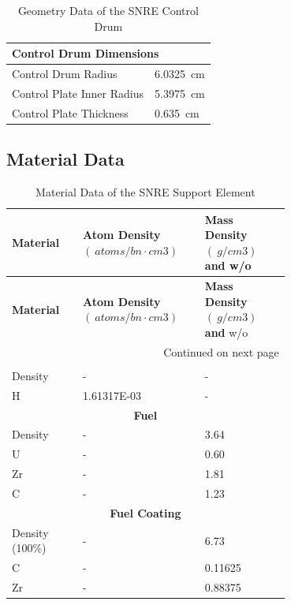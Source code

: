 \documentclass[8pt,a5paper]{article}
\begin{document}
\begin{table}[h!]
    \label{table: Table 5}
    \centering
    \small
    \caption{Geometry Data of the SNRE Control Drum}
    \begin{tabular}{|l|l|}
    \hline
    \multicolumn{2}{|l|}{\textbf{Control Drum Dimensions}}\\\hline
    Control Drum Radius & \SI{6.0325}{cm}\\
    Control Plate Inner Radius & \SI{5.3975}{cm}\\
    Control Plate Thickness & \SI{0.635}{cm}\\\hline
    \end{tabular}
\end{table}

\subsection*{Material Data}

\begin{longtable}{|m{0.2\linewidth}|m{0.25\linewidth}|m{0.25\linewidth}|}
    \caption{Material Data of the SNRE Support Element} \\
    
    \hline \textbf{Material} & \textbf{Atom Density $(\SI{}{atoms/bn \cdot cm3})$} & \textbf{Mass Density $(\SI{}{g/cm3})$ and} w/o \\ \hline 
    \endfirsthead
    
    
    \hline \textbf{Material} & \textbf{Atom Density $(\SI{}{atoms/bn \cdot cm3})$} & \textbf{Mass Density $(\SI{}{g/cm3})$ and} w/o \\ \hline 
    \endhead
    
    \hline \multicolumn{3}{|r|}{{Continued on next page}} \\ \hline
    \endfoot
    
    \hline
    \endlastfoot
    \multicolumn{3}{|c|}{\textbf{Fuel Element Coolant}}\\\hline
    Density & - & - \\
    H & \SI{1.61317E-03}{}& - \\\hline
    \multicolumn{3}{|c|}{\textbf{Fuel}}\\\hline
    Density & - & \SI{3.64}{} \\
    U & - & \SI{0.60}{} \\
    Zr & - & \SI{1.81}{} \\
    C & - & \SI{1.23}{} \\\hline
    \multicolumn{3}{|c|}{\textbf{Fuel Coating}}\\\hline
    Density (100\%) & - & \SI{6.73}{} \\
    C & - & \SI{0.11625}{} \\
    Zr & - & \SI{0.88375}{} \\
\end{longtable}
\end{document}
